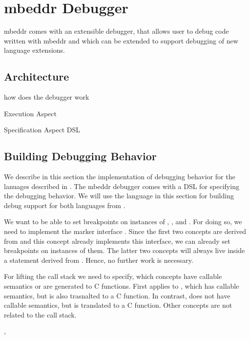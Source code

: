 \section{mbeddr Debugger}

mbeddr comes with an extensible debugger, that allows user to debug code written
with mbeddr and which can be extended to support debugging of new language
extensions.

\subsection{Architecture}
how does the debugger work

Execution Aspect

Specification Aspect
DSL


\subsection{Building Debugging Behavior}

We describe in this section the implementation of debugging behavior for the
lanuages described in . The mbeddr debugger
comes with a \ac{DSL} for specifying the debugging behavior. 
We will use the language in this section for
building debug support for both languages from .

 We want to be able to set breakpoints on instances of
, , and
.
For doing so, we need to implement the marker interface . 
Since the first two concepts
are derived from  and this concept already implements this
interface, we can already set breakpoints on instances of them. The latter two
concepts will always live inside a statement derived
from . Hence, no further work is necessary.

 For lifting the call stack we need to specify, which
concepts have callable semantics or are generated to C functions. First applies
to , which has callable semantics, but is also trasnalted to a C
function. In contrast,  does not have callable
semantics, but is translated to a C function. Other concepts are not
related to the call stack.

 ,  






\ic{}



